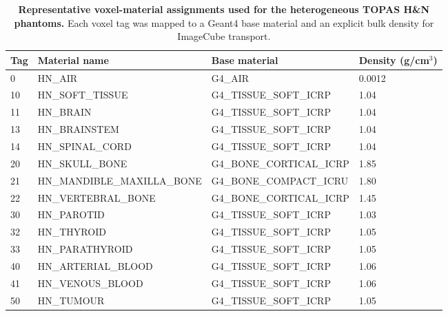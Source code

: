 \begin{table}[H]
\centering
\caption{\textbf{Representative voxel-material assignments used for the heterogeneous TOPAS H\&N phantoms.} Each voxel tag was mapped to a Geant4 base material and an explicit bulk density for ImageCube transport.}
\label{tab:voxel_materials}
\small
\begin{tabular}{llll}
\toprule
Tag & Material name & Base material & Density (g/cm$^3$) \\
\midrule
0 & HN\_AIR & G4\_AIR & 0.0012 \\
10 & HN\_SOFT\_TISSUE & G4\_TISSUE\_SOFT\_ICRP & 1.04 \\
11 & HN\_BRAIN & G4\_TISSUE\_SOFT\_ICRP & 1.04 \\
13 & HN\_BRAINSTEM & G4\_TISSUE\_SOFT\_ICRP & 1.04 \\
14 & HN\_SPINAL\_CORD & G4\_TISSUE\_SOFT\_ICRP & 1.04 \\
20 & HN\_SKULL\_BONE & G4\_BONE\_CORTICAL\_ICRP & 1.85 \\
21 & HN\_MANDIBLE\_MAXILLA\_BONE & G4\_BONE\_COMPACT\_ICRU & 1.80 \\
22 & HN\_VERTEBRAL\_BONE & G4\_BONE\_CORTICAL\_ICRP & 1.45 \\
30 & HN\_PAROTID & G4\_TISSUE\_SOFT\_ICRP & 1.03 \\
32 & HN\_THYROID & G4\_TISSUE\_SOFT\_ICRP & 1.05 \\
33 & HN\_PARATHYROID & G4\_TISSUE\_SOFT\_ICRP & 1.05 \\
40 & HN\_ARTERIAL\_BLOOD & G4\_TISSUE\_SOFT\_ICRP & 1.06 \\
41 & HN\_VENOUS\_BLOOD & G4\_TISSUE\_SOFT\_ICRP & 1.06 \\
50 & HN\_TUMOUR & G4\_TISSUE\_SOFT\_ICRP & 1.05 \\
\bottomrule
\end{tabular}
\end{table}

